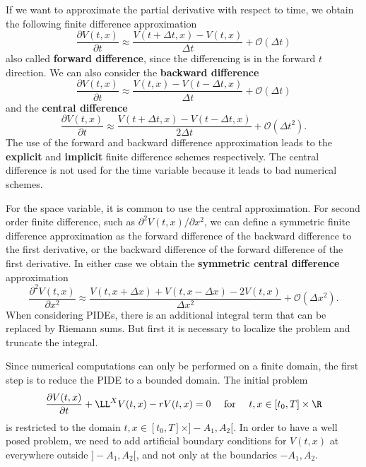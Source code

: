 If we want to approximate the partial derivative with respect to time, we obtain the following finite difference approximation
\begin{equation}
 \frac{\partial V(t,x)}{\partial t} \approx \frac{V(t+\Delta t,x) - V(t,x)}{\Delta t} + \mathcal{O}(\Delta t)
\end{equation}
also called \textbf{forward difference}, since the differencing is in the forward $t$ direction.
We can also consider the \textbf{backward difference}
\begin{equation}
 \frac{\partial V(t,x)}{\partial t} \approx \frac{V(t,x) - V(t-\Delta t,x)}{\Delta t} + \mathcal{O}(\Delta t)
\end{equation}
and the \textbf{central difference}
\begin{equation}
 \frac{\partial V(t,x)}{\partial t} \approx \frac{V(t+\Delta t,x) - V(t-\Delta t,x)}{2 \Delta t} + \mathcal{O}(\Delta t^2).
\end{equation}
The use of the forward and backward difference approximation leads to the \textbf{explicit} and \textbf{implicit} finite difference 
schemes respectively. The central difference is not used for the time variable because it leads to bad numerical schemes.

For the space variable, it is common to use the central approximation.
For second order finite difference, such as $\partial^2 V(t,x)/\partial x^2$, we can define a symmetric finite difference approximation as the 
forward difference of the backward difference to the first derivative, or the backward difference of the forward difference of the first derivative. 
In either case we obtain the \textbf{symmetric central difference} approximation
\begin{equation}
 \frac{\partial^2 V(t,x)}{\partial x^2} \approx \frac{V(t,x+\Delta x) + V(t,x-\Delta x) - 2V(t,x)}{ \Delta x^2} + \mathcal{O}(\Delta x^2).
\end{equation}
When considering PIDEs, there is an additional integral term that can be replaced by Riemann sums. But first it is necessary to localize the problem and truncate the integral.

Since numerical computations can only be performed on a finite domain, the first step is to reduce the PIDE to a bounded domain.
The initial problem
$$  \frac{\partial V(t,x)}{\partial t} + \LL^{X} V(t,x) -r V(t,x) = 0  \quad \mbox{ for } \quad t,x \in [t_0,T]\times \R $$
is restricted to the domain $ t,x \in [t_0,T]\times ]-A_1,A_2[. $
In order to have a well posed problem, we need to add artificial boundary conditions for $V(t,x)$ at everywhere outside $]-A_1,A_2[$, and not only at the boundaries $-A_1, A_2$.

